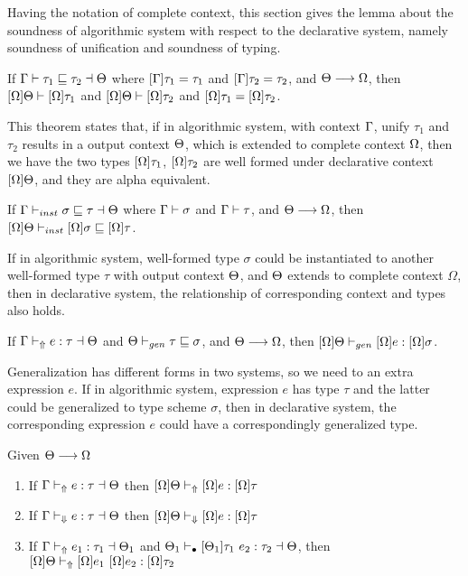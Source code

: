 Having the notation of complete context, this section gives the lemma about the soundness of algorithmic system with respect to the declarative system, namely soundness of unification and soundness of typing.

\begin{theorem}

If $\Gamma \vdash \tau_1 \sqsubseteq \tau_2 \dashv \Theta$ where $[\Gamma] \tau_1 = \tau_1$ and $[\Gamma] \tau_2 = \tau_2$,
and $\Theta \longrightarrow \Omega$,
then $[\Omega]\Theta \vdash [\Omega]\tau_1$ and $[\Omega]\Theta \vdash [\Omega]\tau_2$ and $[\Omega]\tau_1 = [\Omega]\tau_2$.
\end{theorem}

This theorem states that, if in algorithmic system, with context $\Gamma$, unify $\tau_1$ and $\tau_2$ results in a output context $\Theta$, which is extended to complete context $\Omega$, then we have the two types $[\Omega]\tau_1$, $[\Omega]\tau_2$ are well formed under declarative context $[\Omega]\Theta$, and they are alpha equivalent.

\begin{theorem}

If $\Gamma {} \vdash_{inst} \sigma \sqsubseteq \tau \dashv \Theta$ where $\Gamma {} \vdash \sigma$ and $\Gamma {} \vdash \tau$,
and $\Theta \longrightarrow \Omega$,
then $[\Omega]\Theta \vdash_{inst} [\Omega]\sigma \sqsubseteq [\Omega]\tau$.
\end{theorem}

If in algorithmic system, well-formed type $\sigma$ could be instantiated to another well-formed type $\tau$ with output context $\Theta$, and $\Theta$ extends to complete context $\Omega$, then in declarative system, the relationship of corresponding context and types also holds.

\begin{theorem}

If $\Gamma {} \vdash_\Uparrow e:\tau \dashv \Theta $ and $\Theta \vdash_{gen} \tau \sqsubseteq \sigma$,
and $\Theta \longrightarrow \Omega$,
then $[\Omega]\Theta \vdash_{gen} [\Omega]e:[\Omega]\sigma$.
\end{theorem}

Generalization has different forms in two systems, so we need to an extra expression $e$. If in algorithmic system, expression $e$ has type $\tau$ and the latter could be generalized to type scheme $\sigma$, then in declarative system, the corresponding expression $e$ could have a correspondingly generalized type.

\begin{theorem}

Given $\Theta \longrightarrow \Omega$
\begin{enumerate}
   \item If $\Gamma {} \vdash_\Uparrow e: \tau \dashv \Theta$ then $[\Omega]\Theta \vdash_\Uparrow [\Omega]e: [\Omega]\tau$
   \item If $\Gamma {} \vdash_\Downarrow e: \tau \dashv \Theta$ then $[\Omega]\Theta \vdash_\Downarrow [\Omega]e: [\Omega]\tau$
   \item If $\Gamma {} \vdash_\Uparrow e_1:\tau_1 \dashv \Theta_1$ and $\Theta_1 \vdash_\bullet [\Theta_1]\tau_1 ~ e_2 : \tau_2 \dashv \Theta$,
       then $[\Omega]\Theta \vdash_\Uparrow [\Omega]e_1 ~ [\Omega]e_2 : [\Omega]\tau_2$
\end{enumerate}
\end{theorem}

